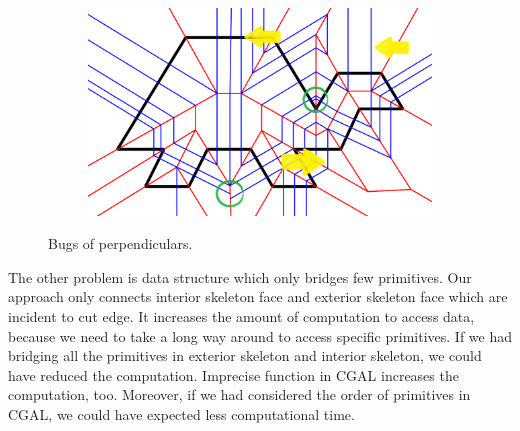\documentclass[11pt]{article}
\begin{document}
\begin{figure}[H]
\begin{subfigure}[b]{0.48\textwidth}
    \caption{}
    \label{fig:dd03}
  \end{subfigure}
  \begin{subfigure}[b]{0.48\textwidth}
    \includegraphics[width=\textwidth]{FIGS/Part5/dedup2}
    \caption{}
     \label{fig:dd04}
  \end{subfigure}
    \caption{Bugs of perpendiculars.}
    \label{fig:deduplication}
\end{figure}
The other problem is data structure which only bridges few primitives. Our approach only connects interior skeleton face and exterior skeleton face which are incident to cut edge. It increases the amount of computation to access data, because we need to take a long way around to access specific primitives. If we had bridging all the primitives in exterior skeleton and interior skeleton, we could have reduced the computation. Imprecise function in CGAL increases the computation, too. Moreover, if we had considered the order of primitives in CGAL, we could have expected less computational time.



\end{document}
